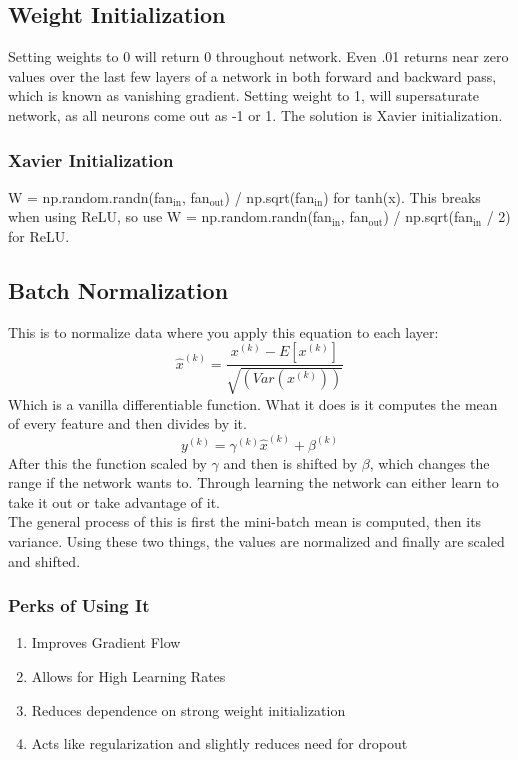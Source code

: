 \documentclass[11pt]{article}
\begin{document}
\begin{enumerate}
\subsection{Weight Initialization}
\label{sec-2-5}
Setting weights to 0 will return 0 throughout network. Even .01 returns near zero values over the last few 
layers of a network in both forward and backward pass, which is known as vanishing gradient. Setting weight to 1, will supersaturate network, as all neurons come out as -1 or 1. The solution is Xavier initialization.
\subsubsection{Xavier Initialization}
\label{sec-2-5-1}
W = np.random.randn(fan$_{\text{in}}$, fan$_{\text{out}}$) / np.sqrt(fan$_{\text{in}}$) for tanh(x). This breaks when using ReLU, so use
W = np.random.randn(fan$_{\text{in}}$, fan$_{\text{out}}$) / np.sqrt(fan$_{\text{in}}$ / 2) for ReLU.
\subsection{Batch Normalization}
\label{sec-2-6}
This is to normalize data where you apply this equation to each layer:
$$\hat{x}^{(k)} = \frac{x^{(k)} - E[x^{(k)}]}{\sqrt{(Var(x^{(k)}))}}$$ 
Which is a vanilla differentiable function. What it does is it computes the mean of every feature and then divides by it.
$$ y^{(k)} = \gamma^{(k)} \hat{x}^{(k)} + \beta^{(k)}$$
After this the function scaled by $\gamma$ and then is shifted by $\beta$, which changes the range if the network wants to. Through learning the network can either learn
to take it out or take advantage of it. \\
The general process of this is first the  mini-batch mean is computed, then its variance. 
Using these two things, the values are normalized and finally are scaled and shifted.
\subsubsection{Perks of Using It}
\label{sec-2-6-1}
\begin{enumerate}
\item Improves Gradient Flow
\label{sec-2-6-1-1}
\item Allows for High Learning Rates
\label{sec-2-6-1-2}
\item Reduces dependence on strong weight initialization
\label{sec-2-6-1-3}
\item Acts like regularization and slightly reduces need for dropout
\label{sec-2-6-1-4}
\end{enumerate}

\end{enumerate}
\end{document}
